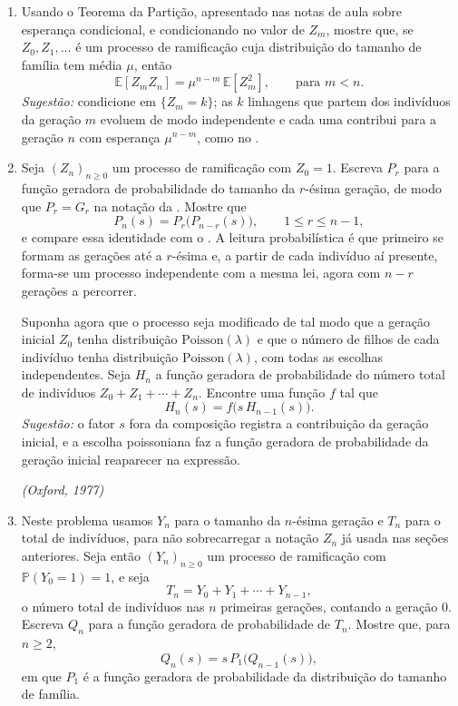 \documentclass[12pt,portuguese]{article}
\theoremstyle{definition}
\theoremstyle{plainexercise}
\theoremstyle{starredexercise}
\theoremstyle{definition}
\begin{document}
\begin{enumerate}[label={\arabic*.}]
\item
Usando o Teorema da Partição, apresentado nas notas de aula sobre esperança
condicional, e condicionando no valor de $Z_m$, mostre que, se
$Z_0,Z_1,\ldots$ é um processo de ramificação cuja distribuição do tamanho de
família tem média $\mu$, então
\[
\mathbb{E}[Z_mZ_n]=\mu^{n-m}\,\mathbb{E}[Z_m^2],
\qquad\text{para } m<n.
\]
\emph{Sugestão:} condicione em $\{Z_m=k\}$; as $k$ linhagens que partem dos
indivíduos da geração $m$ evoluem de modo independente e cada uma contribui
para a geração $n$ com esperança $\mu^{n-m}$, como no
.

\item
Seja $(Z_n)_{n\geqslant 0}$ um processo de ramificação com $Z_0=1$. Escreva $P_r$
para a função geradora de probabilidade do tamanho da $r$-ésima geração, de
modo que $P_r=G_r$ na notação da . Mostre que
\[
P_n(s)=P_r\bigl(P_{n-r}(s)\bigr),
\qquad 1\leqslant r\leqslant n-1,
\]
e compare essa identidade com o . A leitura
probabilística é que primeiro se formam as gerações até a $r$-ésima e, a partir
de cada indivíduo aí presente, forma-se um processo independente com a mesma
lei, agora com $n-r$ gerações a percorrer.

Suponha agora que o processo seja modificado de tal modo que a geração inicial
$Z_0$ tenha distribuição $\mathrm{Poisson}(\lambda)$ e que o número de filhos de
cada indivíduo tenha distribuição $\mathrm{Poisson}(\lambda)$, com todas as
escolhas independentes. Seja $H_n$ a função geradora de probabilidade do número
total de indivíduos $Z_0+Z_1+\cdots+Z_n$. Encontre uma função $f$ tal que
\[
H_n(s)=f\bigl(s\,H_{n-1}(s)\bigr).
\]
\emph{Sugestão:} o fator $s$ fora da composição registra a contribuição da
geração inicial, e a escolha poissoniana faz a função geradora de probabilidade
da geração inicial reaparecer na expressão.

\smallskip
\noindent\emph{(Oxford, 1977)}

\item
Neste problema usamos $Y_n$ para o tamanho da $n$-ésima geração e $T_n$ para o
total de indivíduos, para não sobrecarregar a notação $Z_n$ já usada nas seções
anteriores. Seja então $(Y_n)_{n\geqslant 0}$ um processo de ramificação com
$\mathbb{P}(Y_0=1)=1$, e seja
\[
T_n=Y_0+Y_1+\cdots+Y_{n-1},
\]
o número total de indivíduos nas $n$ primeiras gerações, contando a geração
$0$. Escreva $Q_n$ para a função geradora de probabilidade de $T_n$. Mostre
que, para $n\geqslant 2$,
\[
Q_n(s)=s\,P_1\bigl(Q_{n-1}(s)\bigr),
\]
em que $P_1$ é a função geradora de probabilidade da distribuição do tamanho de
família.


\end{enumerate}
\end{document}
